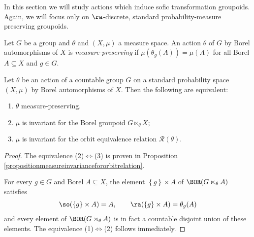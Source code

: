 %
%
%
%
In this section we will study actions which induce sofic transformation groupoids. Again, we will focus only on $\ra$-discrete, standard probability-measure preserving groupoids.


\begin{definition}\label{definitionpmpaction}
Let $G$ be a group and $\theta$ and $(X,\mu)$ a measure space. An action $\theta$ of $G$ by Borel automorphisms of $X$ is \emph{measure-preserving} if $\mu(\theta_g(A))=\mu(A)$ for all Borel $A\subseteq X$ and $g\in G$.%
\end{definition}

\begin{proposition}\label{propositionactionsmeasurepreserving}
Let $\theta$ be an action of a countable group $G$ on a standard probability space $(X,\mu)$ by Borel automorphisms of $X$. Then the following are equivalent:
\begin{enumerate}
\item[(1)] $\theta$ measure-preserving.%
\item[(2)] $\mu$ is invariant for the Borel groupoid $G\ltimes_\theta X$;
\item[(3)] $\mu$ is invariant for the orbit equivalence relation $\mathcal{R}(\theta)$.%
\end{enumerate}
\end{proposition}
\begin{proof}
The equivalence (2)$\iff$(3) is proven in Proposition \ref{propositionmeasureinvariancefororbitrelation}.

For every $g\in G$ and Borel $A\subseteq X$, the element $\left\{g\right\}\times A$ of $\BOR(G\ltimes_\theta A)$ satisfies
\[\so(\left\{g\right\}\times A)=A,\qquad\ra(\left\{g\right\}\times A)=\theta_g(A)\]
and every element of $\BOR(G\rtimes_\theta A)$ is in fact a countable disjoint union of these elements. The equivalence (1)$\iff$(2) follows immediately.\qedhere
\end{proof}

